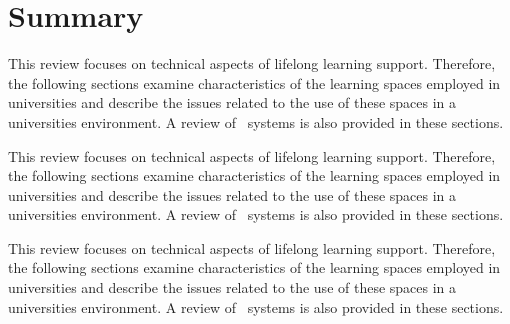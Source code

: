 \section{Summary}

This review focuses on technical aspects of lifelong learning support.
Therefore, the following sections examine characteristics of the learning spaces
employed in universities and describe the issues related to the use of these
spaces in a universities environment. A review of \ep~systems is also
provided in these sections.

This review focuses on technical aspects of lifelong learning support.
Therefore, the following sections examine characteristics of the learning spaces
employed in universities and describe the issues related to the use of these
spaces in a universities environment. A review of \ep~systems is also
provided in these sections.

This review focuses on technical aspects of lifelong learning support.
Therefore, the following sections examine characteristics of the learning spaces
employed in universities and describe the issues related to the use of these
spaces in a universities environment. A review of \ep~systems is also
provided in these sections.